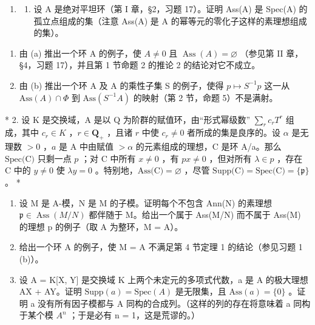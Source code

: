 
\begin{enumerate}
\def\labelenumi{\arabic{enumi}.}
\tightlist
\item
  \begin{enumerate}
  \def\labelenumii{(\alph{enumii})}
  \tightlist
  \item
    设 A 是绝对平坦环（第 I 章，§2，习题 17）。证明 Ass(A) 是 Spec(A) 的孤立点组成的集（注意 Ass(A) 是 A 的幂等元的零化子这样的素理想组成的集）。
  \end{enumerate}
\end{enumerate}

\begin{enumerate}
\def\labelenumi{(\alph{enumi})}
\setcounter{enumi}{1}
\item
  由 (a) 推出一个环 A 的例子，使 \(A \neq 0\) 且 \(\operatorname{Ass}(A) = \varnothing\) （参见第 II 章，§4，习题 17），并且第 1 节命题 2 的推论 2 的结论对它不成立。
\item
  由 (b) 推出一个环 A 及 A 的乘性子集 S 的例子，使得 \(p \mapsto S^{-1}p\) 这一从 \(\text{Ass}(A) \cap \Phi\) 到 \(\text{Ass}(S^{-1}A)\) 的映射（第 2 节，命题 5）不是满射。
\end{enumerate}

* 2. 设 K 是交换域，A 是以 Q 为阶群的赋值环，由``形式幂级数'' \(\sum_{r} c_r T^r\) 组成，其中 \(c_r \in K\) ，\(r \in \mathbf{Q}_+\) ，且诸 \(r\) 中使 \(c_r \neq 0\) 者所成的集是良序的。设 \(\alpha\) 是无理数 \(>0\) ，\(a\) 是 A 中由赋值 \(>\alpha\) 的元素组成的理想，C 是环 A/a。那么 \(\text{Spec(C)}\) 只剩一点 \(p\) ；对 C 中所有 \(x \neq 0\) ，有 \(px \neq 0\) ，但对所有 \(\lambda \in p\) ，存在 C 中的 \(y \neq 0\) 使 \(\lambda y = 0\) 。特别地，\(\text{Ass(C)} = \varnothing\) ，尽管 \(\text{Supp(C)} = \text{Spec(C)} = \{\mathfrak{p}\}\) 。 *

\begin{enumerate}
\def\labelenumi{\arabic{enumi}.}
\setcounter{enumi}{2}
\item
  设 M 是 A-模，N 是 M 的子模。证明每个不包含 Ann(N) 的素理想 \(\mathfrak{p} \in \operatorname{Ass}(M/N)\) 都伴随于 M。给出一个属于 Ass(M/N) 而不属于 Ass(M) 的理想 p 的例子（取 A 为整环，M = A）。
\item
  给出一个环 A 的例子，使 M = A 不满足第 4 节定理 1 的结论（参见习题 1 (b)）。
\item
  设 A = K{[}X, Y{]} 是交换域 K 上两个未定元的多项式代数，a 是 A 的极大理想 AX + AY。证明 \(\text{Supp}(a) = \text{Spec}(A)\) 是无限集，且 \(\text{Ass}(a) = \{0\}\) 。证明 a 没有所有因子模都与 A 同构的合成列。（这样的列的存在将意味着 a 同构于某个模 \(A^{n}\) ；于是必有 n = 1，这是荒谬的。）
\end{enumerate}

